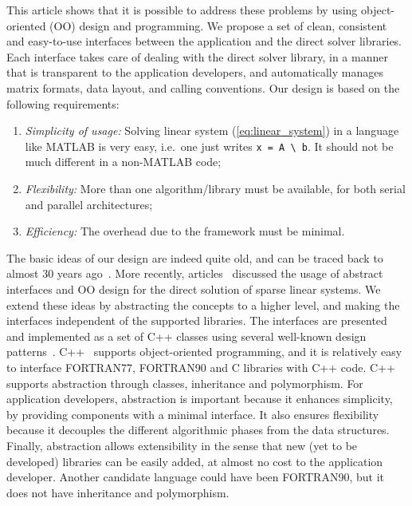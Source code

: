 \documentclass[acmtoms,acmnow]{acmtrans2m}
\begin{document}
This article shows that it is possible to address these problems by
using object-oriented (OO) design and programming.  We propose a set
of clean, consistent and easy-to-use interfaces between the
application and the direct solver libraries.  Each interface takes
care of dealing with the direct solver library, in a manner that is
transparent to the application developers, and automatically manages
matrix formats, data layout, and calling conventions. Our design is
based on the following requirements:
\begin{enumerate}

\item {\sl Simplicity of usage:} Solving linear system
(\ref{eq:linear_system}) in a language like MATLAB is very easy, i.e.~one just
writes \verb!x = A \ b!. It should not be much different in a non-MATLAB
code;

\item {\sl Flexibility:} More than one algorithm/library must be available,
  for both serial and parallel architectures;

\item {\sl Efficiency:} The overhead due to the framework must be minimal.
\end{enumerate}

The basic ideas of our design are indeed quite old, and can be traced back to
almost 30 years ago~\cite{duff79performance,george79design}. More recently,
  articles~\cite{george99object,dobrian99design} discussed the usage of
  abstract interfaces and OO design for the direct solution of sparse linear
  systems.  We extend these ideas by abstracting the concepts to
a higher level, and making the interfaces independent of the
supported libraries. The interfaces are presented and implemented as
a set of C++ classes using several well-known design
patterns~\cite{Gamma}. C++~\cite{cppbook} supports object-oriented
programming, and it is relatively easy to interface FORTRAN77,
FORTRAN90 and C libraries with C++ code. C++ supports abstraction
through classes, inheritance and polymorphism. For application
developers, abstraction is important because it enhances simplicity,
by providing components with a minimal interface. It also ensures
flexibility because it decouples the different algorithmic phases
from the data structures. Finally, abstraction allows extensibility
in the sense that new (yet to be developed) libraries can be easily
added, at almost no cost to the application developer. Another
candidate language could have been FORTRAN90, but it does not have
inheritance and polymorphism.
\end{document}
